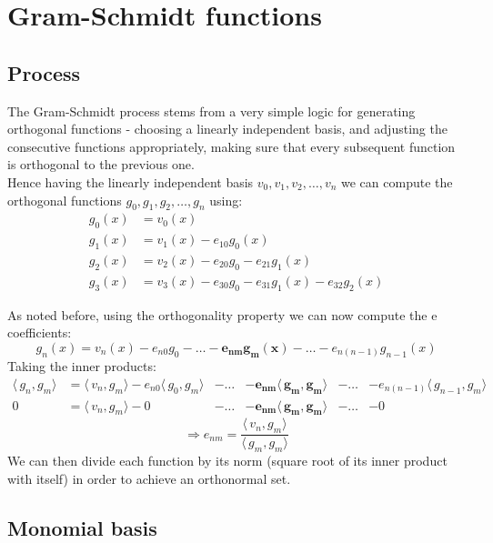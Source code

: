 \documentclass[a4paper]{article}
\numberwithin{equation}{section}
\begin{document}
\section{Gram-Schmidt functions}

\subsection{Process}

The Gram-Schmidt process stems from a very simple logic for generating orthogonal functions - choosing a linearly independent basis, and adjusting the consecutive functions appropriately, making sure that every subsequent function is orthogonal to the previous one.
\\
Hence having the linearly independent basis $v_0, v_1, v_2, \ldots, v_n$ we can compute the orthogonal functions $g_0, g_1, g_2, \ldots, g_n$ using:
\begin{align}
g_0(x) &= v_0(x) \\
g_1(x) &= v_1(x) - e_{10} g_0 (x) \\
g_2(x) &= v_2(x) - e_{20} g_0 - e_{21} g_1 (x) \\
g_3(x) &= v_3(x) - e_{30} g_0 - e_{31} g_1 (x) - e_{32} g_2 (x)
\end{align}

\noindent As noted before, using the orthogonality property we can now compute the e coefficients:
\begin{equation} g_n(x) = v_n(x) - e_{n0} g_0 - \ldots - \boldsymbol{e_{nm} g_m (x)} - \ldots - e_{n(n-1)} g_{n-1} (x) \end{equation}
Taking the inner products:
\begin{align}
\langle\,g_n,g_m\rangle &= \langle\,v_n,g_m\rangle - e_{n0} \langle\,g_0,g_m\rangle &- \ldots &- \boldsymbol{e_{nm} \langle\,g_m,g_m\rangle} &- \ldots &- e_{n(n-1)} \langle\,g_{n-1},g_m\rangle \\
0 &= \langle\,v_n,g_m\rangle - 0 &- \ldots &- \boldsymbol{e_{nm} \langle\,g_m,g_m\rangle} &- \ldots &- 0
\end{align}
\begin{equation} \Rightarrow e_{nm} = \frac{\langle\,v_n,g_m\rangle}{\langle\,g_m,g_m\rangle} \end{equation}
We can then divide each function by its norm (square root of its inner product with itself) in order to achieve an orthonormal set.

\subsection{Monomial basis}
\end{document}
